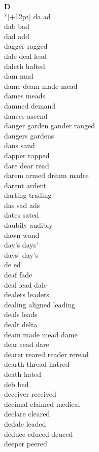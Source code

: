 \vspace{14pt}
\noindent\textbf{\Large D}\\*[+12pt]
da ad\\
dab bad\\
dad add\\
dagger ragged\\
dale deal lead\\
daleth halted\\
dam mad\\
dame deam made mead\\
dames meads\\
damned demand\\
dances ascend\\
danger garden gander ranged\\
dangers gardens\\
dans sand\\
dapper rapped\\
dare dear read\\
darem armed dream madre\\
darent ardent\\
darting trading\\
das sad ads\\
dates sated\\
daubily audibly\\
dawn wand\\
day's days'\\
days' day's\\
de ed\\
deaf fade\\
deal lead dale\\
dealers leaders\\
dealing aligned leading\\
deals leads\\
dealt delta\\
deam made mead dame\\
dear read dare\\
dearer reared reader reread\\
dearth thread hatred\\
death hated\\
deb bed\\
deceiver received\\
decimal claimed medical\\
declare cleared\\
dedale leaded\\
deduce educed deuced\\
deeper peered\\
